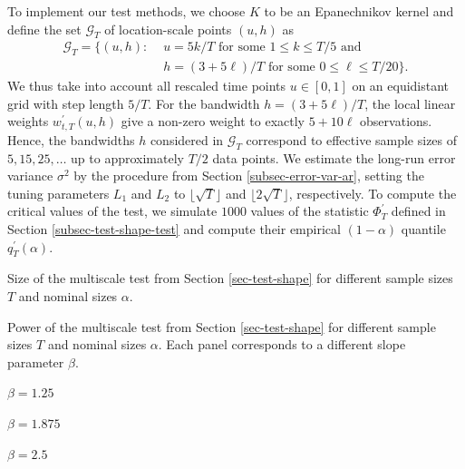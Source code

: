 To implement our test methods, we choose $K$ to be an Epanechnikov kernel and define the set $\mathcal{G}_T$ of location-scale points $(u,h)$ as
\begin{align}
\mathcal{G}_T = \big\{ (u, h): & \, \, u = 5k/T \text{ for some } 1 \le k \le T/5 \text{ and } \nonumber \\ & \, \, h = (3+5\ell)/T \text{ for some } 0 \le \ell \le T/20 \big\}. \label{grid-sim-app}
\end{align}
We thus take into account all rescaled time points $u \in [0,1]$ on an equidistant grid with step length $5/T$. For the bandwidth $h = (3 + 5\ell)/T$, the local linear weights $w_{t,T}^\prime(u,h)$ give a non-zero weight to exactly $5 + 10 \ell$ observations. Hence, the bandwidths $h$ considered in $\mathcal{G}_T$ correspond to effective sample sizes of $5, 15, 25, \ldots$ up to approximately $T/2$ data points. We estimate the long-run error variance $\sigma^2$ by the procedure from Section \ref{subsec-error-var-ar}, setting the tuning parameters $L_1$ and $L_2$ to $\lfloor \sqrt{T} \rfloor$ and $\lfloor 2\sqrt{T} \rfloor$, respectively. To compute the critical values of the test, we simulate $1000$ values of the statistic $\Phi^\prime_T$ defined in Section \ref{subsec-test-shape-test} and compute their empirical $(1-\alpha)$ quantile $q_T^\prime(\alpha)$. 


\begin{table}[t]
\footnotesize{
\begin{center}
\caption{Size of the multiscale test from Section \ref{sec-test-shape} for different sample sizes $T$ and nominal sizes $\alpha$.}
\label{tab:size_shape}
\renewcommand{\arraystretch}{1.2}

\end{center}}
\footnotesize{
\begin{center}
\caption{Power of the multiscale test from Section \ref{sec-test-shape} for different sample sizes $T$ and nominal sizes $\alpha$. Each panel corresponds to a different slope parameter $\beta$.}\label{tab:power_shape}
\begin{subtable}[b]{0.32\textwidth}
\centering
\caption{$\beta = 1.25$}\label{tab:power_050_ll_shape}
\renewcommand{\arraystretch}{1.2}

\end{subtable}
\begin{subtable}[b]{0.32\textwidth}
\centering
\caption{$\beta = 1.875$}\label{tab:power_075_ll_shape}
\renewcommand{\arraystretch}{1.2}

\end{subtable}
\begin{subtable}[b]{0.32\textwidth}
\centering
\caption{$\beta = 2.5$}\label{tab:power_100_ll_shape}
\renewcommand{\arraystretch}{1.2}

\end{subtable}
\end{center}}
\vspace{-0.4cm}
\end{table}



